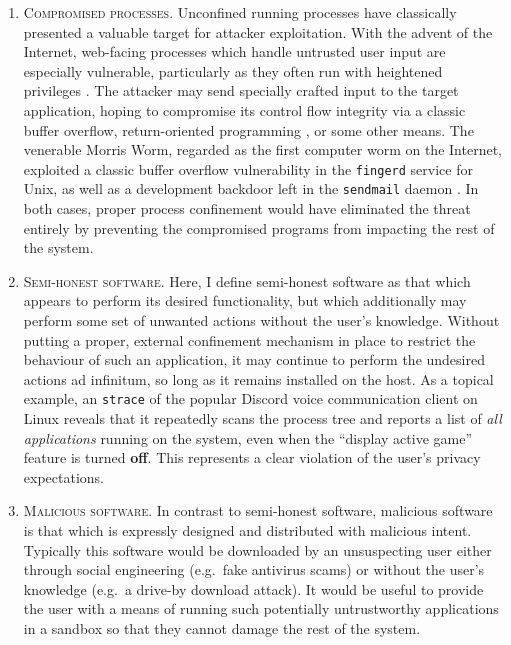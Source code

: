 \documentclass[dvipsnames, 12pt]{article}
\begin{document}
\begin{enumerate}[label=\bfseries A\arabic*., ref=A\arabic*, labelindent=2em]
    \item \label{a:1} \textsc{Compromised processes.} Unconfined running
    processes have classically presented a valuable target for attacker
    exploitation. With the advent of the Internet, web-facing processes which
    handle untrusted user input are especially vulnerable, particularly as they
    often run with heightened privileges \cite{cohen1996_secure}. The attacker
    may send specially crafted input to the target application, hoping to
    compromise its control flow integrity via a classic buffer overflow,
    return-oriented programming \cite{shacham2007_rop}, or some other means. The
    venerable Morris Worm, regarded as the first computer worm on the Internet,
    exploited a classic buffer overflow vulnerability in the \texttt{fingerd}
    service for Unix, as well as a development backdoor left in the
    \texttt{sendmail} daemon \cite{spafford1989_morris}. In both cases, proper
    process confinement would have eliminated the threat entirely by preventing
    the compromised programs from impacting the rest of the system.

    \item \label{a:2} \textsc{Semi-honest software.} Here, I define semi-honest
    software as that which appears to perform its desired functionality, but
    which additionally may perform some set of unwanted actions without the
    user's knowledge. Without putting a proper, external confinement mechanism
    in place to restrict the behaviour of such an application, it may continue
    to perform the undesired actions ad infinitum, so long as it remains
    installed on the host. As a topical example, an \texttt{strace} of the
    popular Discord \cite{discord} voice communication client on Linux reveals that
    it repeatedly scans the process tree and reports a list of \textit{all applications}
    running on the system, even when the \enquote{display active game} feature
    is turned \textbf{off}. This represents a clear violation of the user's
    privacy expectations.

    \item \label{a:3} \textsc{Malicious software.} In contrast to semi-honest
    software, malicious software is that which is expressly designed and
    distributed with malicious intent. Typically this software would be
    downloaded by an unsuspecting user either through social engineering
    (e.g.~fake antivirus scams) or without the user's knowledge (e.g.~a drive-by
    download attack). It would be useful to provide the user with a means of
    running such potentially untrustworthy applications in a sandbox so that
    they cannot damage the rest of the system.
\end{enumerate}
\end{document}
